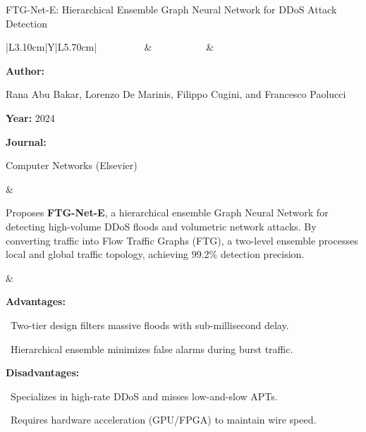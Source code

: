 \documentclass[aspectratio=169,10pt]{beamer}
\newcommand{\lrhdr}{%
  \rowcolor{prismNavy}%
  {\scriptsize\textcolor{white}{\textbf{Citation}}} &
  {\scriptsize\textcolor{white}{\textbf{Summary}}} &
  {\scriptsize\textcolor{white}{\textbf{Advantages \& Disadvantages}}} \\}
\begin{document}
\begin{frame}[t]{FTG-Net-E: Hierarchical Ensemble Graph Neural Network for DDoS Attack Detection}
\vspace{-0.30em}
{\footnotesize\setlength{\tabcolsep}{3.5pt}\renewcommand{\arraystretch}{1.10}
\begin{tabularx}{\textwidth}{|L{3.10cm}|Y|L{5.70cm}|}
\hline\lrhdr\hline
\begin{minipage}[t]{\linewidth}\fontsize{7.2pt}{9.2pt}\raggedright\selectfont
\textbf{Author:}\par
Rana Abu Bakar, Lorenzo De Marinis, Filippo Cugini, and Francesco Paolucci\par\vspace{4pt}
\textbf{Year:} 2024\par\vspace{4pt}
\textbf{Journal:}\par
Computer Networks (Elsevier)\par\vspace{4pt}
\end{minipage}
&
\begin{minipage}[t]{\linewidth}\fontsize{7.2pt}{9.2pt}\raggedright\selectfont
Proposes \textbf{FTG-Net-E}, a hierarchical ensemble Graph Neural Network for detecting high-volume DDoS floods and volumetric network attacks. By converting traffic into Flow Traffic Graphs (FTG), a two-level ensemble processes local and global traffic topology, achieving 99.2\% detection precision.\par\vspace{4pt}
\end{minipage}
&
\begin{minipage}[t]{\linewidth}\fontsize{7.2pt}{9.0pt}\raggedright\selectfont
\textcolor{strengthGreen}{\textbf{Advantages:}}\par\vspace{1.5pt}
\textbullet~Two-tier design filters massive floods with sub-millisecond delay.\par\vspace{2.0pt}\textbullet~Hierarchical ensemble minimizes false alarms during burst traffic.\par\vspace{4.0pt}
\textcolor{limitRed}{\textbf{Disadvantages:}}\par\vspace{1.5pt}
\textbullet~Specializes in high-rate DDoS and misses low-and-slow APTs.\par\vspace{2.0pt}\textbullet~Requires hardware acceleration (GPU/FPGA) to maintain wire speed.\par\vspace{4pt}
\end{minipage} \\\hline
\end{tabularx}}
\end{frame}
\end{document}

